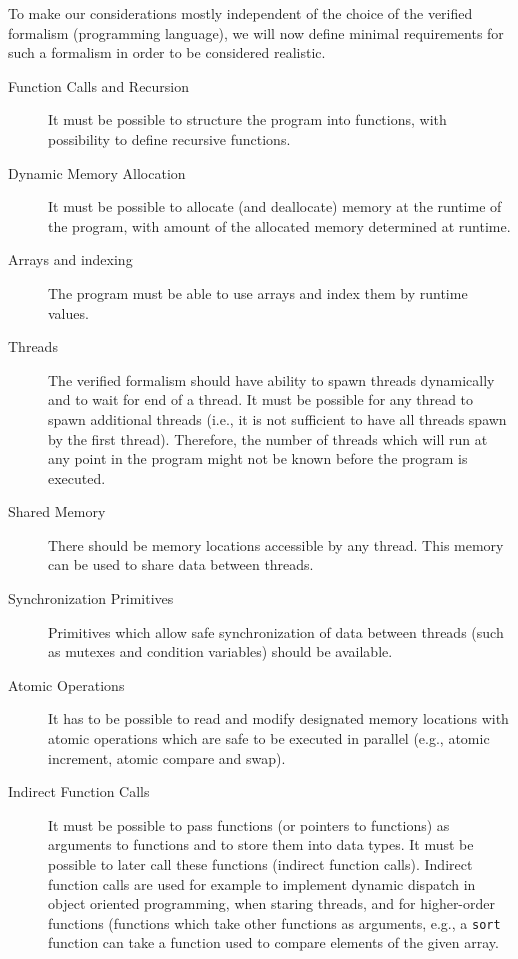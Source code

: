 To make our considerations mostly independent of the choice of the verified
formalism (programming language), we will now define minimal requirements for
such a formalism in order to be considered realistic.

\begin{description}
    \item[Function Calls and Recursion] It must be possible to structure the
        program into functions, with possibility to define recursive functions.

    \item[Dynamic Memory Allocation] It must be possible to allocate (and
        deallocate) memory at the runtime of the program, with amount of the
        allocated memory determined at runtime.

    \item[Arrays and indexing] The program must be able to use arrays and index
        them by runtime values.

    \item[Threads] The verified formalism should have ability to spawn threads
        dynamically and to wait for end of a thread.
        It must be possible for any thread to spawn additional threads (i.e.,
        it is not sufficient to have all threads spawn by the first thread).
        Therefore, the number of threads which will run at any point in the
        program might not be known before the program is executed.

    \item[Shared Memory] There should be memory locations accessible by any
        thread.
        This memory can be used to share data between threads.

    \item[Synchronization Primitives] Primitives which allow safe
        synchronization of data between threads (such as mutexes and condition
        variables) should be available.

    \item[Atomic Operations] It has to be possible to read and modify
        designated memory locations with atomic operations which are safe to be
        executed in parallel (e.g., atomic increment, atomic compare and swap).

    \item[Indirect Function Calls] It must be possible to pass functions (or
        pointers to functions) as arguments to functions and to store them into
        data types.
        It must be possible to later call these functions (indirect function
        calls).
        Indirect function calls are used for example to implement dynamic
        dispatch in object oriented programming, when staring threads, and for
        higher-order functions (functions which take other functions as
        arguments, e.g., a \texttt{sort} function can take a function used to
        compare elements of the given array.


\end{description}
